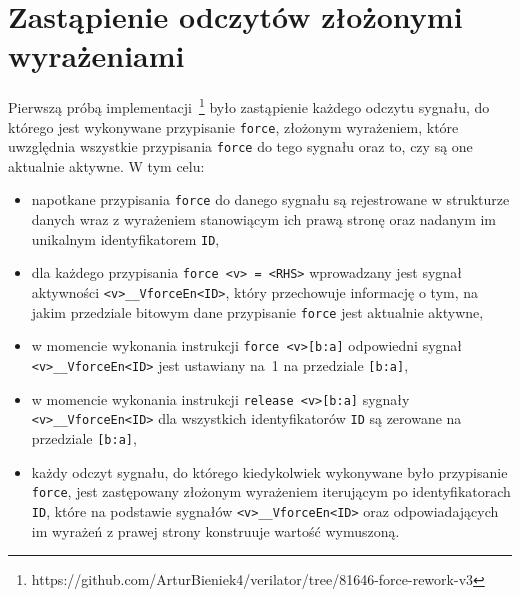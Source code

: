 \documentclass[shortabstract, inz]{iithesis}
\begin{document}
\section{Zastąpienie odczytów złożonymi wyrażeniami}
Pierwszą próbą implementacji~\footnote{https://github.com/ArturBieniek4/verilator/tree/81646-force-rework-v3} było zastąpienie każdego odczytu sygnału, do którego jest wykonywane przypisanie \texttt{force}, złożonym wyrażeniem, które uwzględnia wszystkie przypisania \texttt{force} do tego sygnału oraz to, czy są one aktualnie aktywne. W tym celu:
\begin{itemize}
    \item napotkane przypisania \texttt{force} do danego sygnału są rejestrowane w strukturze danych wraz z wyrażeniem stanowiącym ich prawą stronę oraz nadanym im unikalnym identyfikatorem \texttt{ID},
    \item dla każdego przypisania \texttt{force <v> = <RHS>} wprowadzany jest sygnał aktywności \texttt{<v>\_\_VforceEn<ID>}, który przechowuje informację o tym, na jakim przedziale bitowym dane przypisanie \texttt{force} jest aktualnie aktywne,
    \item w momencie wykonania instrukcji \texttt{force <v>[b:a]} odpowiedni sygnał \texttt{<v>\_\_VforceEn<ID>} jest ustawiany na~1 na przedziale \texttt{[b:a]},
    \item w momencie wykonania instrukcji \texttt{release <v>[b:a]} sygnały \texttt{<v>\_\_VforceEn<ID>} dla wszystkich identyfikatorów \texttt{ID} są zerowane na przedziale \texttt{[b:a]},
    \item każdy odczyt sygnału, do którego kiedykolwiek wykonywane było przypisanie \texttt{force}, jest zastępowany złożonym wyrażeniem iterującym po identyfikatorach \texttt{ID}, które na podstawie sygnałów \texttt{<v>\_\_VforceEn<ID>} oraz odpowiadających im wyrażeń z prawej strony konstruuje wartość wymuszoną.

\end{itemize}
\end{document}
